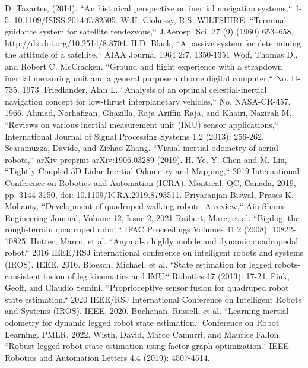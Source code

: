 \documentclass[conference]{IEEEtran}
\begin{document}
\begin{thebibliography}{00}
 D. Tazartes, (2014). ``An historical perspective on inertial navigation systems,`` 1-5. 10.1109/ISISS.2014.6782505. 
 W.H. Clohessy, R.S. WILTSHIRE, ``Terminal guidance system for satellite rendezvous,`` J.Aerosp. Sci. 27 (9) (1960) 653–658, http://dx.doi.org/10.2514/8.8704.
 H.D. Black, ``A passive system for determining the attitude of a satellite,`` AIAA Journal 1964 2:7, 1350-1351
 Wolf, Thomas D., and Robert C. McCracken. ``Ground and flight experience with a strapdown inertial measuring unit and a general purpose airborne digital computer,`` No. H-735. 1973.
 Friedlander, Alan L. ``Analysis of an optimal celestial-inertial navigation concept for low-thrust interplanetary vehicles,`` No. NASA-CR-457. 1966.
 Ahmad, Norhafizan, Ghazilla, Raja Ariffin Raja, and Khairi, Nazirah M. ``Reviews on various inertial measurement unit (IMU) sensor applications,`` International Journal of Signal Processing Systems 1.2 (2013): 256-262.
 Scaramuzza, Davide, and Zichao Zhang. ``Visual-inertial odometry of aerial robots,`` arXiv preprint arXiv:1906.03289 (2019).
 H. Ye, Y. Chen and M. Liu, ``Tightly Coupled 3D Lidar Inertial Odometry and Mapping,`` 2019 International Conference on Robotics and Automation (ICRA), Montreal, QC, Canada, 2019, pp. 3144-3150, doi: 10.1109/ICRA.2019.8793511.
 Priyaranjan Biswal, Prases K. Mohanty, ``Development of quadruped walking robots: A review,`` Ain Shams Engineering Journal, Volume 12, Issue 2, 2021
 Raibert, Marc, et al. ``Bigdog, the rough-terrain quadruped robot.`` IFAC Proceedings Volumes 41.2 (2008): 10822-10825.
 Hutter, Marco, et al. ``Anymal-a highly mobile and dynamic quadrupedal robot.`` 2016 IEEE/RSJ international conference on intelligent robots and systems (IROS). IEEE, 2016.
 Bloesch, Michael, et al. ``State estimation for legged robots-consistent fusion of leg kinematics and IMU.`` Robotics 17 (2013): 17-24.
 Fink, Geoff, and Claudio Semini. ``Proprioceptive sensor fusion for quadruped robot state estimation.`` 2020 IEEE/RSJ International Conference on Intelligent Robots and Systems (IROS). IEEE, 2020.
 Buchanan, Russell, et al. ``Learning inertial odometry for dynamic legged robot state estimation.`` Conference on Robot Learning. PMLR, 2022.
 Wisth, David, Marco Camurri, and Maurice Fallon. ``Robust legged robot state estimation using factor graph optimization.`` IEEE Robotics and Automation Letters 4.4 (2019): 4507-4514.

\end{thebibliography}
\end{document}
